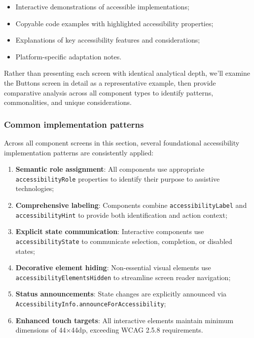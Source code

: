 \begin{itemize}
    \item Interactive demonstrations of accessible implementations;
    \item Copyable code examples with highlighted accessibility properties;
    \item Explanations of key accessibility features and considerations;
    \item Platform-specific adaptation notes.
\end{itemize}

Rather than presenting each screen with identical analytical depth, we'll examine the Buttons screen in detail as a representative example, then provide comparative analysis across all component types to identify patterns, commonalities, and unique considerations.

\subsubsection{Common implementation patterns}
\label{subsubsec:common-patterns}

Across all component screens in this section, several foundational accessibility implementation patterns are consistently applied:

\begin{enumerate}
    \item \textbf{Semantic role assignment}: All components use appropriate \texttt{accessibilityRole} properties to identify their purpose to assistive technologies;
    
    \item \textbf{Comprehensive labeling}: Components combine \texttt{accessibilityLabel} and \\\texttt{accessibilityHint} to provide both identification and action context;
    
    \item \textbf{Explicit state communication}: Interactive components use \texttt{accessibilityState} to communicate selection, completion, or disabled states;
    
    \item \textbf{Decorative element hiding}: Non-essential visual elements use \\\texttt{accessibilityElementsHidden} to streamline screen reader navigation;
    
    \item \textbf{Status announcements}: State changes are explicitly announced via \\\texttt{AccessibilityInfo.announceForAccessibility};
    
    \item \textbf{Enhanced touch targets}: All interactive elements maintain minimum dimensions of 44×44dp, exceeding WCAG 2.5.8 requirements.
\end{enumerate}

